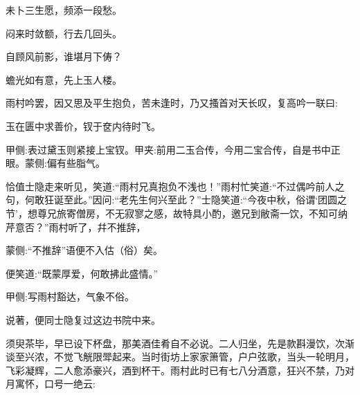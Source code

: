 \begin{poem}
    \begin{pl}未卜三生愿，频添一段愁。\end{pl}

    \begin{pl}闷来时敛额，行去几回头。\end{pl}

    \begin{pl}自顾风前影，谁堪月下俦？\end{pl}

    \begin{pl}蟾光如有意，先上玉人楼。\end{pl}
\end{poem}


\begin{parag}
    雨村吟罢，因又思及平生抱负，苦未逢时，乃又搔首对天长叹，复高吟一联曰:
\end{parag}


\begin{poem}
    \begin{pl}玉在匮中求善价，钗于奁内待时飞。\begin{note}甲侧:表过黛玉则紧接上宝钗。甲夹:前用二玉合传，今用二宝合传，自是书中正眼。蒙侧:偏有些脂气。\end{note}\end{pl}\end{poem}


\begin{parag}
    恰值士隐走来听见，笑道:“雨村兄真抱负不浅也！”雨村忙笑道:“不过偶吟前人之句，何敢狂诞至此。”因问:“老先生何兴至此？”士隐笑道:“今夜中秋，俗谓‘团圆之节’，想尊兄旅寄僧房，不无寂寥之感，故特具小酌，邀兄到敝斋一饮，不知可纳芹意否？”雨村听了，幷不推辞，\begin{note}蒙侧:“不推辞”语便不入估（俗）矣。\end{note}便笑道:“既蒙厚爱，何敢拂此盛情。”\begin{note}甲侧:写雨村豁达，气象不俗。\end{note}说著，便同士隐复过这边书院中来。
\end{parag}


\begin{parag}
    须臾茶毕，早已设下杯盘，那美酒佳肴自不必说。二人归坐，先是款斟漫饮，次渐谈至兴浓，不觉飞觥限斝起来。当时街坊上家家箫管，户户弦歌，当头一轮明月，飞彩凝辉，二人愈添豪兴，酒到杯干。雨村此时已有七八分酒意，狂兴不禁，乃对月寓怀，口号一绝云:
\end{parag}


